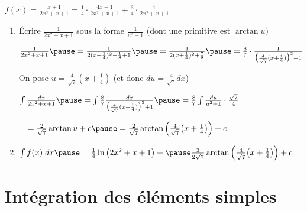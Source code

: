 \begin{frame}

\begin{exemple}
\hfil $f(x) = \frac{x+1}{2x^2+x+1}
= \frac14 \cdot \frac{4x+1}{2x^2+x+1} + \frac34 \cdot \frac{1}{2x^2+x+1}$

\pause
\medskip

\begin{enumerate}
\setcounter{enumi}{\thesaveenumi}
  \item \'Ecrire $\frac{1}{2x^2+x+1}$ sous la forme $\frac{1}{u^2+1}$ \pause (dont une primitive est $\arctan u$)

\pause
\medskip
\hfil $\frac{1}{2x^2+x+1} \pause=  \frac{1}{2(x+\frac 14)^2-\frac18+1}
\pause=\frac{1}{2(x+\frac 14)^2+\frac78}
\pause= \frac87 \cdot \frac{1}{\big(\frac{4}{\sqrt7}(x+\frac 14)\big)^2+1}$

\medskip
\pause

On pose  $u= \frac{4}{\sqrt7}(x+\frac 14)$ \pause(et donc $du = \frac{4}{\sqrt7} dx$) 
\pause

\hfil $\int \frac{dx}{2x^2+x+1} 
\pause= \int \frac87 \frac{dx}{\big(\frac{4}{\sqrt7}(x+\frac 14)\big)^2+1}
\pause= \frac 87 \int \frac{du}{u^2+1} \cdot \frac{\sqrt7}{4}$

\pause
\hfil $\quad = \frac{2}{\sqrt7}\arctan u+ c 
\pause= \frac{2}{\sqrt7}\arctan \left(\frac{4}{\sqrt7}\big(x+\frac 14\big)\right) + c$

\medskip
\pause

  \item $\int f(x)\; dx \pause= \frac14\ln \big(2x^2+x+1\big) 
+\pause \frac{3}{2\sqrt7}\arctan \left(\frac{4}{\sqrt7}\big(x+\frac 14\big)\right)+c$

\end{enumerate}
\end{exemple}
\end{frame}





\section*{Intégration des éléments simples}


